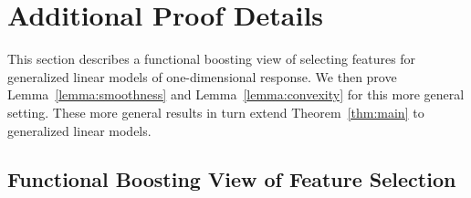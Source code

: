 
\section{Additional Proof Details}
\label{sec:proof_II}
This section describes a functional boosting view of selecting features for generalized linear models of one-dimensional response. We then prove Lemma~\ref{lemma:smoothness} and Lemma~\ref{lemma:convexity} for this more general setting. These more general
results in turn extend Theorem~\ref{thm:main} to generalized 
linear models.

\subsection{Functional Boosting View of Feature Selection}
\label{sec:functional}

